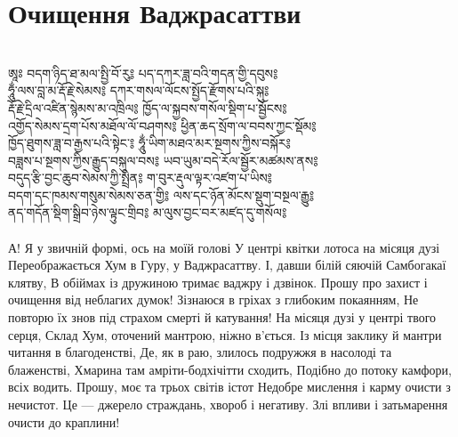 \section{Очищення Ваджрасаттви}
\\
\ti
ཨཱཿ བདག་ཉིད་ཐ་མལ་སྤྱི་བོ་རུ༔ པད་དཀར་ཟླ་བའི་གདན་གྱི་དབུས༔ \\
ཧཱུྂ་ལས་བླ་མ་རྡོ་རྗེ་སེམས༔ དཀར་གསལ་ལོངས་སྤྱོད་རྫོགས་པའི་སྐུ༔\\
རྡོ་རྗེ་དྲིལ་འཛིན་སྙེམས་མ་འཁྲིལ༔ ཁྱོད་ལ་སྐྱབས་གསོལ་སྡིག་པ་སྦྱོངས༔ \\
འགྱོད་སེམས་དྲག་པོས་མཐོལ་ལོ་བཤགས༔ ཕྱིན་ཆད་སྲོག་ལ་བབས་ཀྱང་སྡོམ༔ \\
ཁྱོད་ཐུགས་ཟླ་བ་རྒྱས་པའི་སྟེང་༔ ཧཱུྂ་ཡིག་མཐའ་མར་སྔགས་ཀྱིས་བསྐོར༔ \\
བཟླས་པ་སྔགས་ཀྱིས་རྒྱུད་བསྐུལ་བས༔ ཡབ་ཡུམ་བདེ་རོལ་སྦྱོར་མཚམས་ནས༔ \\
བདུད་རྩི་བྱང་ཆུབ་སེམས་ཀྱི་སྤྲིན༔ ག་བུར་རྡུལ་ལྟར་འཛག་པ་ཡིས༔ \\
བདག་དང་ཁམས་གསུམ་སེམས་ཅན་གྱི༔ ལས་དང་ཉོན་མོངས་སྡུག་བསྔལ་རྒྱུ༔ \\
ནད་གདོན་སྡིག་སྒྲིབ་ཉེས་ལྟུང་གྲིབ༔ མ་ལུས་བྱང་བར་མཛད་དུ་གསོལ༔\\
\\
\ru
А! Я у звичній формі, ось на моїй голові
У центрі квітки лотоса на місяця дузі
Переображається Хум в Гуру, у Ваджрасаттву.
І, давши білій сяючій Самбогакаї клятву,
В обіймах із дружиною тримає ваджру і дзвінок.
Прошу про захист і очищення від неблагих думок!
Зізнаюся в гріхах з глибоким покаянням,
Не повторю їх знов під страхом смерті й катування!
На місяця дузі у центрі твого серця,
Склад Хум, оточений мантрою, ніжно в'ється.
Із місця заклику й мантри читання в благоденстві,
Де, як в раю, злилось подружжя в насолоді та блаженстві,
Хмарина там амріти-бодхічітти сходить,
Подібно до потоку камфори, всіх водить.
Прошу, моє та трьох світів істот
Недобре мислення і карму очисти з нечистот.
Це --- джерело страждань, хвороб і негативу.
Злі впливи і затьмарення очисти до краплини!


